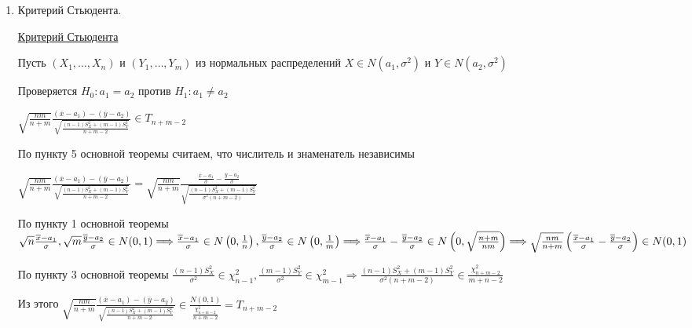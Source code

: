 \begin{enumerate}
    Если нулевая гипотеза отклоняется, то отклоняется общая гипотеза об однородности. А если основная гипотеза принимается, то 
    применяем критерий Стьюдента

    \item Критерий Стьюдента.

    \hyperlink{students_criterion}{Критерий Стьюдента}

    Пусть $(X_1, \dots, X_n)$ и $(Y_1, \dots, Y_m)$ из нормальных распределений $X \in N(a_1, \sigma^2)$ и $Y \in N(a_2, \sigma^2)$

    Проверяется $H_0 : a_1 = a_2$ против $H_1 : a_1 \neq a_2$

    \begin{MyTheorem}
        \Ths $\sqrt{\frac{nm}{n + m}} \frac{(\overline x - a_1) - (\overline y - a_2)}{\sqrt{\frac{(n - 1) S_X^2 + (m - 1) S^2_Y}{n + m - 2}}} \in T_{n + m - 2}$
    \end{MyTheorem}

    \begin{MyProof}
        По пункту 5 основной теоремы считаем, что числитель и знаменатель независимы 

        $\sqrt{\frac{nm}{n + m}} \frac{(\overline x - a_1) - (\overline y - a_2)}{\sqrt{\frac{(n - 1) S_X^2 + (m - 1) S^2_Y}{n + m - 2}}} = 
        \sqrt{\frac{nm}{n + m}} \frac{\frac{\overline x - a_1}{\sigma} - \frac{\overline y - a_2}{\sigma}}{\sqrt{\frac{(n - 1) S_X^2 + (m - 1) S^2_Y}{\sigma^2 (n + m - 2)}}}$

        По пункту 1 основной теоремы $\sqrt{n} \frac{\overline x - a_1}{\sigma}, \sqrt{m} \frac{\overline y - a_2}{\sigma} \in N(0, 1) \Longrightarrow \\
        \frac{\overline x - a_1}{\sigma} \in N\left(0, \frac{1}{n}\right), \frac{\overline y - a_2}{\sigma} \in N\left(0, \frac{1}{m}\right) \Longrightarrow \\
        \frac{\overline x - a_1}{\sigma} - \frac{\overline y - a_2}{\sigma} \in N\left(0, \sqrt{\frac{n + m}{nm}}\right) \Longrightarrow \\
        \sqrt{\frac{nm}{n + m}} \left(\frac{\overline x - a_1}{\sigma} - \frac{\overline y - a_2}{\sigma}\right) \in N(0, 1)$

        По пункту 3 основной теоремы $\frac{(n - 1)S^2_X}{\sigma^2} \in \chi^2_{n - 1}, \frac{(m - 1)S^2_Y}{\sigma^2} \in \chi^2_{m - 1} \Longrightarrow
        \frac{(n - 1) S_X^2 + (m - 1) S^2_Y}{\sigma^2 (n + m - 2)} \in \frac{\chi^2_{n + m - 2}}{m + n - 2}$

        Из этого $\sqrt{\frac{nm}{n + m}} \frac{(\overline x - a_1) - (\overline y - a_2)}{\sqrt{\frac{(n - 1) S_X^2 + (m - 1) S^2_Y}{n + m - 2}}} \in \frac{N(0, 1)}{\frac{\chi^2_{n + m - 2}}{n + m - 2}} = T_{n + m - 2}$
    \end{MyProof}


\end{enumerate}
